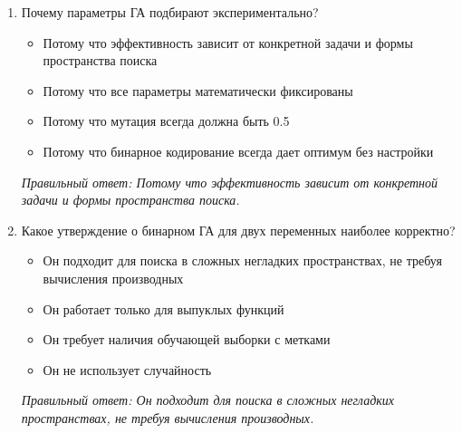 \begin{enumerate}[label=\textbf{\arabic*.}, leftmargin=0pt, itemsep=1.2em]
\item Почему параметры ГА подбирают экспериментально?
\begin{itemize}[label=$\square$, leftmargin=1.5cm, itemsep=0.2em, topsep=0.3em]
\item Потому что эффективность зависит от конкретной задачи и формы пространства поиска
\item Потому что все параметры математически фиксированы
\item Потому что мутация всегда должна быть 0.5
\item Потому что бинарное кодирование всегда дает оптимум без настройки
\end{itemize}
{\small\textit{Правильный ответ: Потому что эффективность зависит от конкретной задачи и формы пространства поиска.}}

\item Какое утверждение о бинарном ГА для двух переменных наиболее корректно?
\begin{itemize}[label=$\square$, leftmargin=1.5cm, itemsep=0.2em, topsep=0.3em]
\item Он подходит для поиска в сложных негладких пространствах, не требуя вычисления производных
\item Он работает только для выпуклых функций
\item Он требует наличия обучающей выборки с метками
\item Он не использует случайность
\end{itemize}
{\small\textit{Правильный ответ: Он подходит для поиска в сложных негладких пространствах, не требуя вычисления производных.}}

\end{enumerate}
